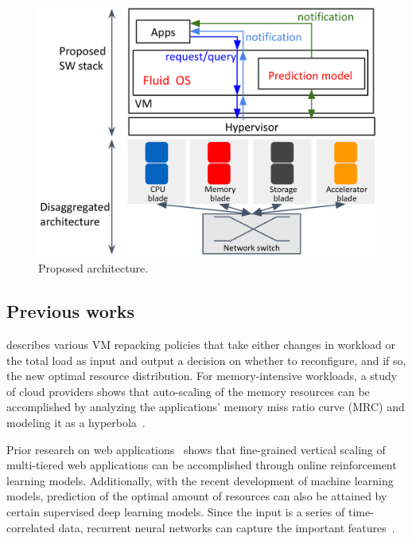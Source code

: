 \begin{figure}[]
     \centering
     \includegraphics[scale=0.15]{images/architecture.png}
     \caption{Proposed architecture.}
     \label{fig:archi}
\end{figure}

\subsection{Previous works} \cite{sedaghat2013virtual} describes various VM
repacking policies that take either changes in workload or the total load as
input and output a decision on whether to reconfigure, and if so, the new
optimal resource distribution.  For memory-intensive workloads, a study of cloud
providers shows that auto-scaling of the memory resources can be accomplished by
analyzing the applications' memory miss ratio curve (MRC) and modeling it as a
hyperbola~\cite{novak2020auto}.

Prior research on web applications~\cite{yazdanov2014lightweight} shows that
fine-grained vertical scaling of multi-tiered web applications can be
accomplished through online reinforcement learning models.  Additionally, with
the recent development of machine learning models, prediction of the optimal
amount of resources can also be attained by certain supervised deep learning
models.  Since the input is a series of time-correlated data, recurrent neural
networks can capture the important features~\cite{gers1999learning}.

